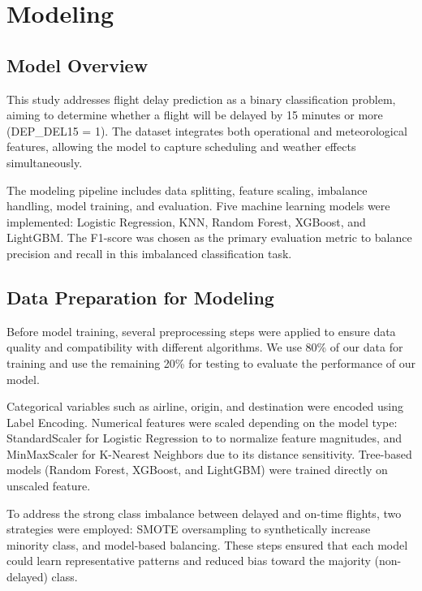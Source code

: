 \documentclass[a4paper,12pt]{report}
\begin{document}
\chapter{Modeling}
\section{Model Overview}
This study addresses flight delay prediction as a binary classification problem, aiming to determine whether a flight will be delayed by 15 minutes or more (DEP\_DEL15 = 1). The dataset integrates both operational and meteorological features, allowing the model to capture scheduling and weather effects simultaneously.

The modeling pipeline includes data splitting, feature scaling, imbalance handling, model training, and evaluation. Five machine learning models were implemented: Logistic Regression, KNN, Random Forest, XGBoost, and LightGBM. The F1-score was chosen as the primary evaluation metric to balance precision and recall in this imbalanced classification task.

\section{Data Preparation for Modeling}
Before model training, several preprocessing steps were applied to ensure data quality and compatibility with different algorithms. We use 80\% of our data for training and use the remaining 20\% for testing to evaluate the performance of our model.

Categorical variables such as airline, origin, and destination were encoded using Label Encoding. Numerical features were scaled depending on the model type: StandardScaler for Logistic Regression to to normalize feature magnitudes, and MinMaxScaler for K-Nearest Neighbors due to its distance sensitivity. Tree-based models (Random Forest, XGBoost, and LightGBM) were trained directly on unscaled feature.

To address the strong class imbalance between delayed and on-time flights, two strategies were employed: SMOTE oversampling to synthetically increase minority class, and model-based balancing. These steps ensured that each model could learn representative patterns and reduced bias toward the majority (non-delayed) class.
\end{document}
